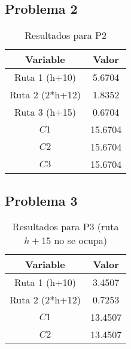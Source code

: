 \documentclass[letterpaper,12pt]{article}
\begin{document}
\subsection{Problema 2}
\begin{table}[h!]
    \centering
    \begin{tabular}{|c|c|}
    \hline
    \textbf{Variable} & \textbf{Valor} \\ \hline
    Ruta 1 (h+10)     & 5.6704         \\ \hline
    Ruta 2 (2*h+12)   & 1.8352         \\ \hline
    Ruta 3 (h+15)            & 0.6704         \\ \hline
    $C1$              & 15.6704        \\ \hline
    $C2$              & 15.6704        \\ \hline
    $C3$              & 15.6704        \\ \hline
    \end{tabular}
    \caption{Resultados para P2}
\end{table}

\subsection{Problema 3}
\begin{table}[h!]
    \centering
    \begin{tabular}{|c|c|}
    \hline
    \textbf{Variable} & \textbf{Valor} \\ \hline
    Ruta 1 (h+10)     & 3.4507         \\ \hline
    Ruta 2 (2*h+12)   & 0.7253         \\ \hline
    $C1$              & 13.4507        \\ \hline
    $C2$              & 13.4507        \\ \hline
    \end{tabular}
    \caption{Resultados para P3 (ruta $h+15$ no se ocupa)}
\end{table}

\newpage
\end{document}
